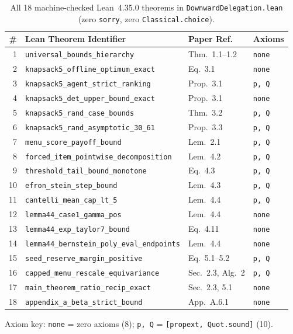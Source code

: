 \documentclass[10pt,twocolumn]{article}
\begin{document}
\begin{table}[t]
\centering
\caption{All 18 machine-checked Lean~4.35.0 theorems in \texttt{DownwardDelegation.lean} (zero \texttt{sorry}, zero \texttt{Classical.choice}).}
\label{tab:lean}
\scriptsize
\setlength{\tabcolsep}{2.6pt}
\begin{tabular}{@{}rlll@{}}
\toprule
\# & Lean Theorem Identifier & Paper Ref. & Axioms \\
\midrule
1 & \texttt{universal\_bounds\_hierarchy} & Thm.~1.1--1.2 & \texttt{none} \\
2 & \texttt{knapsack5\_offline\_optimum\_exact} & Eq.~3.1 & \texttt{none} \\
3 & \texttt{knapsack5\_agent\_strict\_ranking} & Prop.~3.1 & \texttt{p, Q} \\
4 & \texttt{knapsack5\_det\_upper\_bound\_exact} & Prop.~3.1 & \texttt{none} \\
5 & \texttt{knapsack5\_rand\_case\_bounds} & Thm.~3.2 & \texttt{p, Q} \\
6 & \texttt{knapsack5\_rand\_asymptotic\_30\_61} & Prop.~3.3 & \texttt{p, Q} \\
7 & \texttt{menu\_score\_payoff\_bound} & Lem.~2.1 & \texttt{p, Q} \\
8 & \texttt{forced\_item\_pointwise\_decomposition} & Lem.~4.2 & \texttt{p, Q} \\
9 & \texttt{threshold\_tail\_bound\_monotone} & Eq.~4.3 & \texttt{p, Q} \\
10 & \texttt{efron\_stein\_step\_bound} & Lem.~4.3 & \texttt{p, Q} \\
11 & \texttt{cantelli\_mean\_cap\_lt\_5} & Lem.~4.4 & \texttt{p, Q} \\
12 & \texttt{lemma44\_case1\_gamma\_pos} & Lem.~4.4 & \texttt{none} \\
13 & \texttt{lemma44\_exp\_taylor7\_bound} & Eq.~4.11 & \texttt{none} \\
14 & \texttt{lemma44\_bernstein\_poly\_eval\_endpoints} & Lem.~4.4 & \texttt{none} \\
15 & \texttt{seed\_reserve\_margin\_positive} & Eq.~5.1--5.2 & \texttt{p, Q} \\
16 & \texttt{capped\_menu\_rescale\_equivariance} & Sec.~2.3, Alg.~2 & \texttt{p, Q} \\
17 & \texttt{main\_theorem\_ratio\_recip\_exact} & Sec.~2.3, 5.1 & \texttt{none} \\
18 & \texttt{appendix\_a\_beta\_strict\_bound} & App.~A.6.1 & \texttt{none} \\
\bottomrule
\end{tabular}
\vspace{-0.4em}
\begin{flushleft}
\tiny Axiom key: \texttt{none} = zero axioms (8); \texttt{p, Q} = \texttt{[propext, Quot.sound]} (10).
\end{flushleft}
\vspace{-0.8em}
\end{table}
\end{document}
